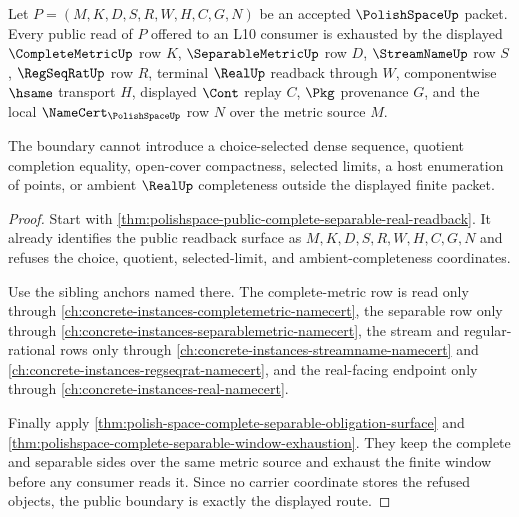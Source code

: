 \begin{theorem}
\label{thm:polishspace-public-finite-window-boundary}
Let $P=(M,K,D,S,R,W,H,C,G,N)$ be an accepted $\PolishSpaceUp$ packet. Every public read of $P$ offered to an L10 consumer is exhausted by the displayed $\CompleteMetricUp$ row $K$, $\SeparableMetricUp$ row $D$, $\StreamNameUp$ row $S$, $\RegSeqRatUp$ row $R$, terminal $\RealUp$ readback through $W$, componentwise $\hsame$ transport $H$, displayed $\Cont$ replay $C$, $\Pkg$ provenance $G$, and the local $\NameCert_{\PolishSpaceUp}$ row $N$ over the metric source $M$.

The boundary cannot introduce a choice-selected dense sequence, quotient completion equality, open-cover compactness, selected limits, a host enumeration of points, or ambient $\RealUp$ completeness outside the displayed finite packet.
\end{theorem}
\begin{proof}
Start with \autoref{thm:polishspace-public-complete-separable-real-readback}. It already identifies the public readback surface as $M,K,D,S,R,W,H,C,G,N$ and refuses the choice, quotient, selected-limit, and ambient-completeness coordinates.

Use the sibling anchors named there. The complete-metric row is read only through \autoref{ch:concrete-instances-completemetric-namecert}, the separable row only through \autoref{ch:concrete-instances-separablemetric-namecert}, the stream and regular-rational rows only through \autoref{ch:concrete-instances-streamname-namecert} and \autoref{ch:concrete-instances-regseqrat-namecert}, and the real-facing endpoint only through \autoref{ch:concrete-instances-real-namecert}.

Finally apply \autoref{thm:polish-space-complete-separable-obligation-surface} and \autoref{thm:polishspace-complete-separable-window-exhaustion}. They keep the complete and separable sides over the same metric source and exhaust the finite window before any consumer reads it. Since no carrier coordinate stores the refused objects, the public boundary is exactly the displayed route.
\end{proof}

